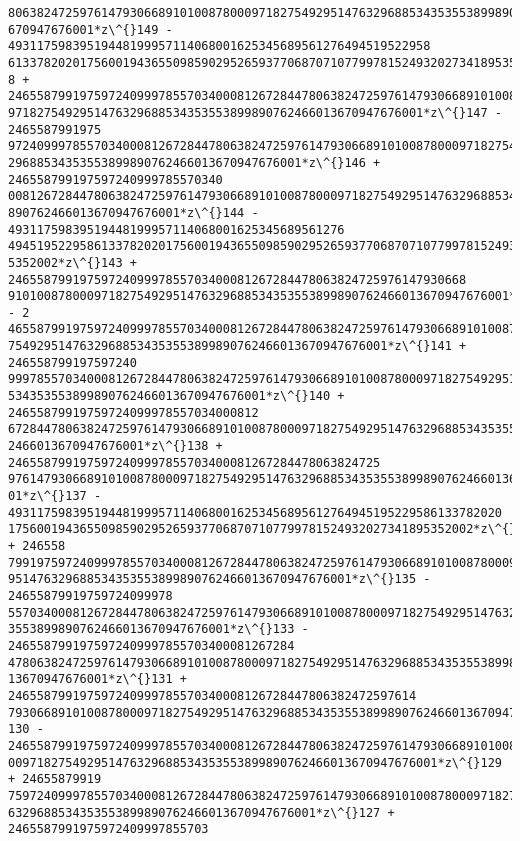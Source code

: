 \documentclass[11pt]{article}
\begin{document}
\begin{tcolorbox}[breakable, size=fbox, boxrule=.5pt, pad at break*=1mm, opacityfill=0]
\begin{Verbatim}[commandchars=\\\{\}]
80638247259761479306689101008780009718275492951476329688534353553899890762466013
670947676001*z\^{}149 - 49311759839519448199957114068001625345689561276494519522958
613378202017560019436550985902952659377068707107799781524932027341895352002*z\^{}14
8 + 2465587991975972409997855703400081267284478063824725976147930668910100878000
9718275492951476329688534353553899890762466013670947676001*z\^{}147 - 2465587991975
97240999785570340008126728447806382472597614793066891010087800097182754929514763
29688534353553899890762466013670947676001*z\^{}146 + 246558799197597240999785570340
00812672844780638247259761479306689101008780009718275492951476329688534353553899
890762466013670947676001*z\^{}144 - 49311759839519448199957114068001625345689561276
49451952295861337820201756001943655098590295265937706870710779978152493202734189
5352002*z\^{}143 + 2465587991975972409997855703400081267284478063824725976147930668
9101008780009718275492951476329688534353553899890762466013670947676001*z\^{}142 - 2
46558799197597240999785570340008126728447806382472597614793066891010087800097182
75492951476329688534353553899890762466013670947676001*z\^{}141 + 246558799197597240
99978557034000812672844780638247259761479306689101008780009718275492951476329688
534353553899890762466013670947676001*z\^{}140 + 24655879919759724099978557034000812
67284478063824725976147930668910100878000971827549295147632968853435355389989076
2466013670947676001*z\^{}138 + 2465587991975972409997855703400081267284478063824725
97614793066891010087800097182754929514763296885343535538998907624660136709476760
01*z\^{}137 - 493117598395194481999571140680016253456895612764945195229586133782020
17560019436550985902952659377068707107799781524932027341895352002*z\^{}136 + 246558
79919759724099978557034000812672844780638247259761479306689101008780009718275492
951476329688534353553899890762466013670947676001*z\^{}135 - 24655879919759724099978
55703400081267284478063824725976147930668910100878000971827549295147632968853435
3553899890762466013670947676001*z\^{}133 - 2465587991975972409997855703400081267284
47806382472597614793066891010087800097182754929514763296885343535538998907624660
13670947676001*z\^{}131 + 246558799197597240999785570340008126728447806382472597614
79306689101008780009718275492951476329688534353553899890762466013670947676001*z\^{}
130 - 24655879919759724099978557034000812672844780638247259761479306689101008780
009718275492951476329688534353553899890762466013670947676001*z\^{}129 + 24655879919
75972409997855703400081267284478063824725976147930668910100878000971827549295147
6329688534353553899890762466013670947676001*z\^{}127 + 2465587991975972409997855703

\end{Verbatim}
\end{tcolorbox}
\end{document}
